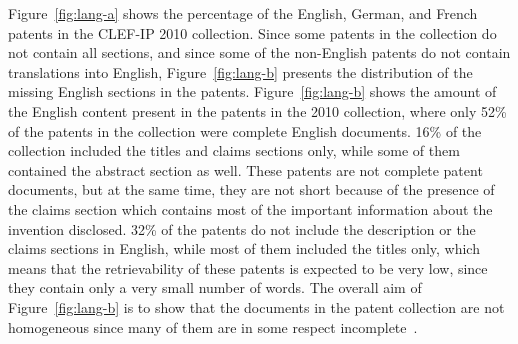 Figure~\ref{fig:lang-a} shows the percentage of the English, German, and French patents in the CLEF-IP 2010 collection. Since some patents in the collection do not contain all sections, and since some of the non-English patents do not contain translations into English, Figure~\ref{fig:lang-b} presents the distribution of the missing English sections in the patents. Figure~\ref{fig:lang-b} shows the amount of the English content present in the patents in the 2010 collection, where only 52\% of the patents in the collection were complete English documents. 16\% of the collection included the titles and claims sections only, while some of them contained the abstract section as well. These patents are not complete patent documents, but at the same time, they are not short because of the presence of the claims section which contains most of the important information about the invention disclosed. 32\% of the patents do not include the description or the claims sections in English, while most of them included the titles only, which means that the retrievability of these patents is expected to be very low, since they contain only a very small number of words. The overall aim of Figure~\ref{fig:lang-b} is to show that the documents in the patent collection are not homogeneous since many of them are in some respect incomplete~\citep{magdy2012toward}.
